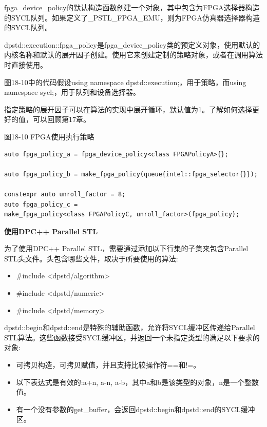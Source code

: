 fpga\_device\_policy的默认构造函数创建一个对象，其中包含为FPGA选择器构造的SYCL队列。如果定义了\_PSTL\_FPGA\_EMU，则为FPGA仿真器选择器构造的SYCL队列。\par

dpstd::execution::fpga\_policy是fpga\_device\_policy类的预定义对象，使用默认的内核名称和默认的展开因子创建。使用它来创建定制的策略对象，或者在调用算法时直接使用。\par

图18-10中的代码假设using namespace dpstd::execution;，用于策略，而using namespace sycl;，用于队列和设备选择器。\par

指定策略的展开因子可以在算法的实现中展开循环，默认值为1。了解如何选择更好的值，可以回顾第17章。\par

\hspace*{\fill} \par %
图18-10 FPGA使用执行策略
\begin{lstlisting}[caption={}]
auto fpga_policy_a = fpga_device_policy<class FPGAPolicyA>{};

auto fpga_policy_b = make_fpga_policy(queue{intel::fpga_selector{}});

constexpr auto unroll_factor = 8;
auto fpga_policy_c = 
make_fpga_policy<class FPGAPolicyC, unroll_factor>(fpga_policy);
\end{lstlisting}

\hspace*{\fill} \par %
\textbf{使用DPC++ Parallel STL}

为了使用DPC++ Parallel STL，需要通过添加以下行集的子集来包含Parallel STL头文件。头包含哪些文件，取决于所要使用的算法:\par

\begin{itemize}
	\item \#include <dpstd/algorithm>
	\item \#include <dpstd/numeric>
	\item \#include <dpstd/memory>
\end{itemize}

dpstd::begin和dpstd::end是特殊的辅助函数，允许将SYCL缓冲区传递给Parallel STL算法。这些函数接受SYCL缓冲区，并返回一个未指定类型的满足以下要求的对象:\par

\begin{itemize}
	\item 可拷贝构造，可拷贝赋值，并且支持比较操作符==和!=。
	\item 以下表达式是有效的:a+n, a-n, a-b，其中a和b是该类型的对象，n是一个整数值。
	\item 有一个没有参数的get\_buffer，会返回dpstd::begin和dpstd::end的SYCL缓冲区。
\end{itemize}

